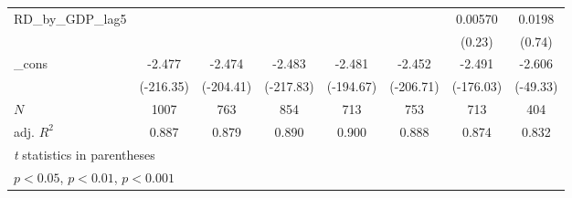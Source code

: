 {\begin{tabular}{l*{7}{c}}
\addlinespace
RD\_by\_GDP\_lag5&                  &                  &                  &                  &                  &  0.00570         &   0.0198         \\
          &                  &                  &                  &                  &                  &   (0.23)         &   (0.74)         \\
\addlinespace
\_cons    &   -2.477\sym{***}&   -2.474\sym{***}&   -2.483\sym{***}&   -2.481\sym{***}&   -2.452\sym{***}&   -2.491\sym{***}&   -2.606\sym{***}\\
          &(-216.35)         &(-204.41)         &(-217.83)         &(-194.67)         &(-206.71)         &(-176.03)         & (-49.33)         \\
\midrule
\(N\)     &     1007         &      763         &      854         &      713         &      753         &      713         &      404         \\
adj. \(R^{2}\)&    0.887         &    0.879         &    0.890         &    0.900         &    0.888         &    0.874         &    0.832         \\
\bottomrule
\multicolumn{8}{l}{\footnotesize \textit{t} statistics in parentheses}\\
\multicolumn{8}{l}{\footnotesize \sym{*} \(p<0.05\), \sym{**} \(p<0.01\), \sym{***} \(p<0.001\)}\\
\end{tabular}
}
